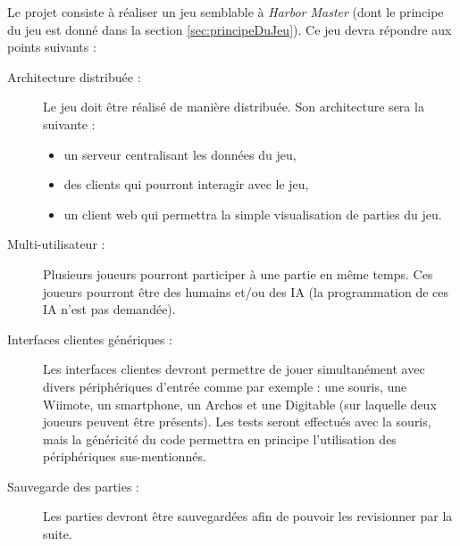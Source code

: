 
Le projet consiste à réaliser un jeu semblable à \emph{Harbor Master} (dont le principe du jeu est donné dans la section \ref{sec:principeDuJeu}). Ce jeu devra répondre aux points suivants :
\begin{description}
\item[Architecture distribuée :] Le jeu doit être réalisé de manière distribuée. Son architecture sera la suivante :
  \begin{itemize}
  \item un serveur centralisant les données du jeu,
  \item des clients qui pourront interagir avec le jeu,
  \item un client web qui permettra la simple visualisation de parties du jeu.
  \end{itemize}
\item[Multi-utilisateur :] Plusieurs joueurs pourront participer à une partie en même temps. Ces joueurs pourront être des humains et/ou des IA (la programmation de ces IA n'est pas demandée).
\item[Interfaces clientes génériques :] Les interfaces clientes devront permettre de jouer simultanément avec divers périphériques d'entrée comme par exemple : une souris, une Wiimote, un smartphone, un Archos et une Digitable (sur laquelle deux joueurs peuvent être présents). Les tests seront effectués avec la souris, mais la généricité du code permettra en principe l'utilisation des périphériques sus-mentionnés.
\item[Sauvegarde des parties :]  Les parties devront être sauvegardées afin de pouvoir les revisionner par la suite.
\end{description}
